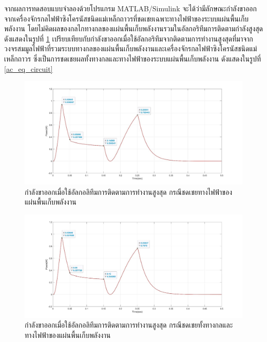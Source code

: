 \documentclass[11pt,a4paper]{article}
\begin{document}
จากผลการทดสอบแบบจำลองด้วยโปรแกรม MATLAB/Simulink จะได้ว่ามีลักษณะกำลังขาออกจากเครื่องจักรกลไฟฟ้าซิงโครนัสชนิดแม่เหล็กถาวรที่ชดเชยเฉพาะทางไฟฟ้าของระบบแผ่นพื้นเก็บพลังงาน โดยไม่คิดผลของกลไกทางกลของแผ่นพื้นเก็บพลังงานรวมในอัลกอริทึมการติดตามกำลังสูงสุด ดังแสดงในรูปที่ \ref{power_ac}
เปรียบเทียบกับกำลังขาออกเมื่อใช้อัลกอริทึมจากติดตามการทำงานสูงสุดที่มาจากวงจรสมมูลไฟฟ้าที่รวมระบบทางกลของแผ่นพื้นเก็บพลังงานและเครื่องจักรกลไฟฟ้าซิงโครนัสชนิดแม่เหล็กถาวร ซึ่งเป็นการชดเชยผลทั้งทางกลและทางไฟฟ้าของระบบแผ่นพื้นเก็บพลังงาน ดังแสดงในรูปที่ \ref{ac_eq_circuit}
\begin{figure}[H]
    \begin{center}
        \includegraphics[width=1\textwidth]{power_ac.jpg}
    \end{center}
    \caption{กำลังขาออกเมื่อใช้อัลกอลิทึมการติดตามการทำงานสูงสุด กรณีชดเชยทางไฟฟ้าของแผ่นพื้นเก็บพลังงาน}
    \label{power_ac}
\end{figure}
\begin{figure}[H]
    \begin{center}
        \includegraphics[width=1\textwidth]{power_ac_Rm.jpg}
    \end{center}
    \caption{กำลังขาออกเมื่อใช้อัลกอลิทึมการติดตามการทำงานสูงสุด กรณีชดเชยทั้งทางกลและทางไฟฟ้าของแผ่นพื้นเก็บพลังงาน}
    \label{power_ac_Rm}
\end{figure}
\end{document}
